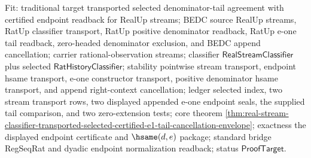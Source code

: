 Fit: traditional target transported selected denominator-tail agreement with
certified endpoint readback for RealUp streams; BEDC source RealUp streams,
RatUp classifier transport, RatUp positive denominator readback, RatUp e-one
tail readback, zero-headed denominator exclusion, and BEDC append cancellation;
carrier rational-observation streams; classifier $\mathsf{RealStreamClassifier}$
plus selected $\mathsf{RatHistoryClassifier}$; stability pointwise stream
transport, endpoint hsame transport, e-one constructor transport, positive
denominator hsame transport, and append right-context cancellation; ledger
selected index, two stream transport rows, two displayed appended e-one endpoint
seals, the supplied tail comparison, and two zero-extension tests; core theorem
\autoref{thm:real-stream-classifier-transported-selected-certified-e1-tail-cancellation-envelope};
exactness the displayed endpoint certificate and $\hsame(d,e)$ package; standard
bridge RegSeqRat and dyadic endpoint normalization readback; status
$\mathsf{ProofTarget}$.
